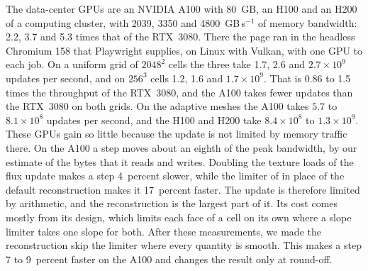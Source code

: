 \documentclass[twocolumn]{aastex701}
\begin{document}
The data-center GPUs are an NVIDIA A100 with 80~GB, an H100 and an H200 of a computing cluster, with 2039, 3350 and 4800~GB\,s$^{-1}$ of memory bandwidth: 2.2, 3.7 and 5.3 times that of the RTX~3080. There the page ran in the headless Chromium 158 that Playwright supplies, on Linux with Vulkan, with one GPU to each job. On a uniform grid of $2048^2$ cells the three take 1.7, 2.6 and $2.7 \times 10^9$ updates per second, and on $256^3$ cells 1.2, 1.6 and $1.7 \times 10^9$. That is 0.86 to 1.5 times the throughput of the RTX~3080, and the A100 takes fewer updates than the RTX~3080 on both grids. On the adaptive meshes the A100 takes $5.7$ to $8.1 \times 10^8$ updates per second, and the H100 and H200 take $8.4 \times 10^8$ to $1.3 \times 10^9$. These GPUs gain so little because the update is not limited by memory traffic there. On the A100 a step moves about an eighth of the peak bandwidth, by our estimate of the bytes that it reads and writes. Doubling the texture loads of the flux update makes a step 4~percent slower, while the limiter of \citet{vanLeer1974} in place of the default reconstruction makes it 17~percent faster. The update is therefore limited by arithmetic, and the reconstruction is the largest part of it. Its cost comes mostly from its design, which limits each face of a cell on its own where a slope limiter takes one slope for both. After these measurements, we made the reconstruction skip the limiter where every quantity is smooth. This makes a step 7 to 9~percent faster on the A100 and changes the result only at round-off.
\end{document}
